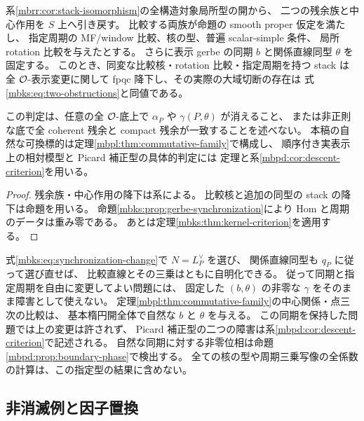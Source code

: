 \begin{corollary}[全構造対象開上の条件付き判定]
\label{mbks:cor:all-o-criterion}
系\ref{mbrr:cor:stack-isomorphism}の全構造対象局所型の開から、
二つの残余族と中心作用を $S$ 上へ引き戻す。
比較する両族が命題の smooth proper 仮定を満たし、
指定周期の MF/window 比較、核の型、普遍 scalar-simple 条件、
局所 rotation 比較を与えたとする。
さらに表示 gerbe の同期 $b$ と関係直線同型 $\theta$ を固定する。
このとき、同変な比較核・rotation 比較・指定周期を持つ stack は
全 $\mathcal O$-表示変更に関して fpqc 降下し、その実際の大域切断の存在は
式\eqref{mbks:eq:two-obstructions}と同値である。

この判定は、任意の全 $\mathcal O$-底上で $\alpha_P$ や $\gamma(P,\theta)$ が消えること、
または非正則な底で全 coherent 残余と compact 残余が一致することを述べない。
本稿の自然な可換標的は定理\ref{mbpl:thm:commutative-family}で構成し、
順序付き実表示上の相対模型と Picard 補正型の具体的判定には
定理と系\ref{mbpd:cor:descent-criterion}を用いる。
\end{corollary}
\begin{proof}
残余族・中心作用の降下は系による。
比較核と追加の同型の stack の降下は命題を用いる。
命題\ref{mbks:prop:gerbe-synchronization}により Hom と周期のデータは重み零である。
あとは定理\ref{mbks:thm:kernel-criterion}を適用する。
\end{proof}

\begin{remark}[同期を自由に変える問題との違い]
\label{mbks:rem:free-synchronization}
式\eqref{mbks:eq:synchronization-change}で $N=L_P^\vee$ を選び、
関係直線同型も $q_P$ に従って選び直せば、
比較直線とその三乗はともに自明化できる。
従って同期と指定周期を自由に変更してよい問題には、
固定した $(b,\theta)$ の非零な $\gamma$ をそのまま障害として使えない。
定理\ref{mbpl:thm:commutative-family}の中心関係・点三次の比較は、
基本楕円開全体で自然な $b$ と $\theta$ を与える。
この同期を保持した問題では上の変更は許されず、
Picard 補正型の二つの障害は系\ref{mbpd:cor:descent-criterion}で記述される。
自然な同期に対する非零位相は命題\ref{mbpd:prop:boundary-phase}で検出する。
全ての核の型や周期三乗写像の全係数の計算は、この指定型の結果に含めない。
\end{remark}

\subsection{非消滅例と因子置換}

